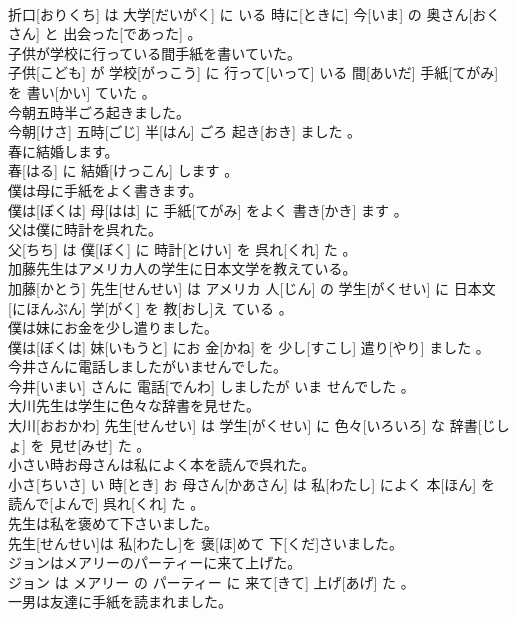 \documentclass[8pt]{extreport}
\begin{document}
\begin{CJK}{UTF8}{min}
\\	折口[おりくち] は 大学[だいがく] に いる 時に[ときに] 今[いま] の 奥さん[おくさん] と 出会った[であった] 。
\\	子供が学校に行っている間手紙を書いていた。	
\\	子供[こども] が 学校[がっこう] に 行って[いって] いる 間[あいだ] 手紙[てがみ] を 書い[かい] ていた 。
\\	今朝五時半ごろ起きました。	
\\	今朝[けさ] 五時[ごじ] 半[はん] ごろ 起き[おき] ました 。
\\	春に結婚します。	
\\	春[はる] に 結婚[けっこん] します 。
\\	僕は母に手紙をよく書きます。	
\\	僕は[ぼくは] 母[はは] に 手紙[てがみ] をよく 書き[かき] ます 。
\\	父は僕に時計を呉れた。	
\\	父[ちち] は 僕[ぼく] に 時計[とけい] を 呉れ[くれ] た 。
\\	加藤先生はアメリカ人の学生に日本文学を教えている。	
\\	加藤[かとう] 先生[せんせい] は アメリカ 人[じん] の 学生[がくせい] に 日本文[にほんぶん] 学[がく] を 教[おし]え ている 。
\\	僕は妹にお金を少し遣りました。	
\\	僕は[ぼくは] 妹[いもうと] にお 金[かね] を 少し[すこし] 遣り[やり] ました 。
\\	今井さんに電話しましたがいませんでした。	
\\	今井[いまい] さんに 電話[でんわ] しましたが いま せんでした 。
\\	大川先生は学生に色々な辞書を見せた。	
\\	大川[おおかわ] 先生[せんせい] は 学生[がくせい] に 色々[いろいろ] な 辞書[じしょ] を 見せ[みせ] た 。
\\	小さい時お母さんは私によく本を読んで呉れた。	
\\	小さ[ちいさ] い 時[とき] お 母さん[かあさん] は 私[わたし] によく 本[ほん] を 読んで[よんで] 呉れ[くれ] た 。
\\	先生は私を褒めて下さいました。	
\\	先生[せんせい]は 私[わたし]を 褒[ほ]めて 下[くだ]さいました。
\\	ジョンはメアリーのパーティーに来て上げた。	
\\	ジョン は メアリー の パーティー に 来て[きて] 上げ[あげ] た 。
\\	一男は友達に手紙を読まれました。	

\end{CJK}
\end{document}
